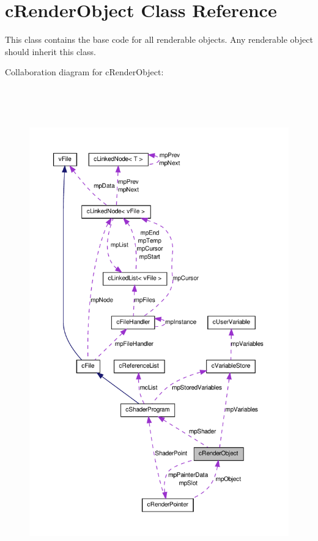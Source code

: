 \hypertarget{classc_render_object}{
\section{cRenderObject Class Reference}
\label{classc_render_object}
}


This class contains the base code for all renderable objects. Any renderable object should inherit this class.  




Collaboration diagram for cRenderObject:\nopagebreak
\begin{figure}[H]
\begin{center}
\leavevmode
\includegraphics[height=600pt]{classc_render_object__coll__graph}
\end{center}
\end{figure}
